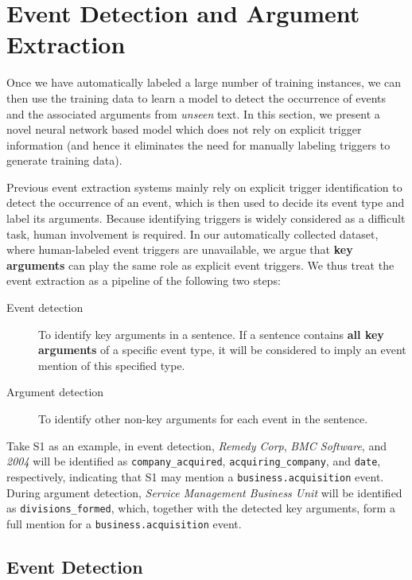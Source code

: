 \section{Event Detection and Argument Extraction}
Once we have automatically labeled a large number of training instances, we can then use the training data to learn a model to detect the
occurrence of events and the associated arguments from \emph{unseen} text. In this section, we present a novel neural network based model
 which does not rely on explicit trigger information (and hence it eliminates the need for manually labeling triggers to generate
 training data).

Previous event extraction systems mainly rely on explicit trigger identification to detect the occurrence of an event, which is then used
to decide its event type and label its arguments. Because identifying triggers is widely considered as a difficult task, human involvement
is required\FIXME{~\cite{}}. In our automatically collected dataset, where human-labeled event triggers are unavailable, we argue that
\textbf{key arguments} can play the same role as explicit event triggers. We thus treat the event extraction as a pipeline of the following
two steps:

\begin{description}
	\item [Event detection]  To identify key arguments in a sentence. If a sentence contains \textbf{all key arguments} of a specific event type, it will be considered to imply an event mention of this specified type.
	\item [Argument detection] To identify other non-key arguments for each event in the sentence.
\end{description}
%
Take S1 as an example, in event detection, \emph{Remedy Corp}, \emph{BMC Software}, and \emph{2004} will be identified as
\texttt{company\_acquired}, \texttt{acquiring\_company}, and \texttt{date}, respectively, indicating that S1 may mention a
\texttt{business.acquisition} event. During argument detection, \emph{Service Management Business Unit} will be identified as
\texttt{divisions\_formed}, which, together with the detected key arguments, form a full mention for a \texttt{business.acquisition} event.

\subsection{Event Detection \label{evede}}

